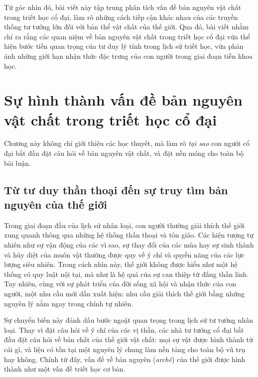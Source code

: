 \documentclass[14pt,a4paper]{extarticle}
\begin{document}
Từ góc nhìn đó, bài viết này tập trung phân tích vấn đề bản nguyên vật chất trong triết học cổ đại, làm rõ những cách tiếp cận khác nhau của các truyền thống tư tưởng lớn đối với bản thể vật chất của thế giới. Qua đó, bài viết nhằm chỉ ra rằng các quan niệm về bản nguyên vật chất trong triết học cổ đại vừa thể hiện bước tiến quan trọng của tư duy lý tính trong lịch sử triết học, vừa phản ánh những giới hạn nhận thức đặc trưng của con người trong giai đoạn tiền khoa học.

\section{Sự hình thành vấn đề bản nguyên vật chất trong triết học cổ đại}

Chương này không chỉ giới thiệu các học thuyết, mà làm rõ \emph{tại sao} con người cổ đại bắt đầu đặt câu hỏi về bản nguyên vật chất, và đặt nền móng cho toàn bộ bài luận.

\subsection{Từ tư duy thần thoại đến sự truy tìm bản nguyên của thế giới}

Trong giai đoạn đầu của lịch sử nhân loại, con người thường giải thích thế giới xung quanh thông qua những hệ thống thần thoại và tôn giáo. Các hiện tượng tự nhiên như sự vận động của các vì sao, sự thay đổi của các mùa hay sự sinh thành và hủy diệt của muôn vật thường được quy về ý chí và quyền năng của các lực lượng siêu nhiên. Trong cách nhìn này, thế giới không được hiểu như một hệ thống có quy luật nội tại, mà như là hệ quả của sự can thiệp từ đấng thần linh. Tuy nhiên, cùng với sự phát triển của đời sống xã hội và nhận thức của con người, một nhu cầu mới dần xuất hiện: nhu cầu giải thích thế giới bằng những nguyên lý nằm ngay trong chính tự nhiên.

Sự chuyển biến này đánh dấu bước ngoặt quan trọng trong lịch sử tư tưởng nhân loại. Thay vì đặt câu hỏi về ý chí của các vị thần, các nhà tư tưởng cổ đại bắt đầu đặt câu hỏi về bản chất của thế giới vật chất: mọi sự vật được hình thành từ cái gì, và liệu có tồn tại một nguyên lý chung làm nền tảng cho toàn bộ vũ trụ hay không. Chính từ đây, vấn đề về bản nguyên (\emph{archê}) của thế giới được hình thành như một vấn đề triết học cơ bản.
\end{document}
